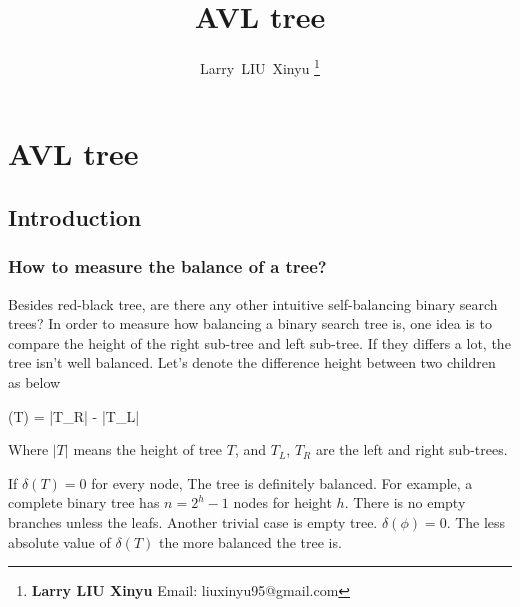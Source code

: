 \documentclass{article}
\begin{document}


\title{AVL tree}

\author{Larry~LIU~Xinyu
\thanks{{\bfseries Larry LIU Xinyu } \newline
  Email: liuxinyu95@gmail.com \newline}
  }

\maketitle
\fi


\ifx\wholebook\relax
\chapter{AVL tree}
\fi

\section{Introduction}
\label{introduction} 

\subsection{How to measure the balance of a tree?}
Besides red-black tree, are there any other intuitive self-balancing
binary search trees? In order to measure how balancing a binary search tree is,
one idea is to compare the height of the right sub-tree and left sub-tree.
If they differs a lot, the tree isn't well balanced. Let's denote the
difference height between two children as below

\be
  \delta(T) = |T_R| - |T_L|
\ee

Where $|T|$ means the height of tree $T$, and $T_L$, $T_R$ are the left
and right sub-trees.

If $\delta(T) = 0$ for every node, The tree is definitely balanced. For example, a
complete binary tree has $n=2^h-1$ nodes for height $h$. There is
no empty branches unless the leafs. Another trivial case is empty
tree. $\delta(\phi) = 0$. The less absolute value of $\delta(T)$
the more balanced the tree is.
\end{document}
